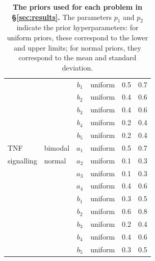 \begin{table}[H]
\begin{adjustwidth}{0in}{0in}
\begin{tabularx}{1.0\textwidth}{llclcc}
&& $b_1$ & uniform & 0.5 & 0.7\\
&& $b_2$ & uniform & 0.4 & 0.6\\
&& $b_3$ & uniform & 0.4 & 0.6\\
&& $b_4$ & uniform & 0.2 & 0.4\\
&& $b_5$ & uniform & 0.2 & 0.4\\
\toprule
TNF  & bimodal  & $a_1$ & uniform & 0.5 & 0.7\\
signalling& normal & $a_2$ & uniform & 0.1 & 0.3\\
&& $a_3$ & uniform & 0.1 & 0.3\\
&& $a_4$ & uniform & 0.4 & 0.6\\
&& $b_1$ & uniform & 0.3 & 0.5\\
&& $b_2$ & uniform & 0.6 & 0.8\\
&& $b_3$ & uniform & 0.2 & 0.4\\
&& $b_4$ & uniform & 0.4 & 0.6\\
&& $b_5$ & uniform & 0.3 & 0.5\\
\end{tabularx}
\caption{\textbf{The priors used for each problem in \S\ref{sec:results}.} The parameters $p_1$ and $p_2$ indicate the prior hyperparameters: for uniform priors, these correspond to the lower and upper limits; for normal priors, they correspond to the mean and standard deviation.}
\label{tab:priors}
\end{adjustwidth}
\end{table}
